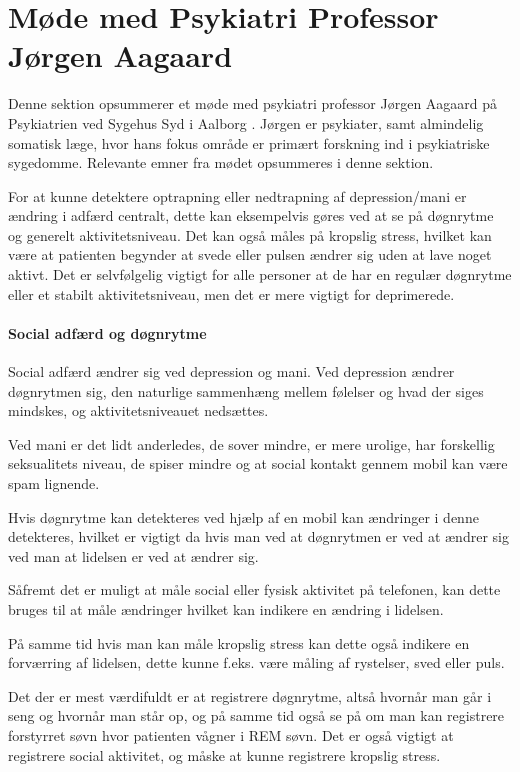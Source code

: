 \section{Møde med Psykiatri Professor Jørgen Aagaard}\label{sec:moede-med-joergen}
Denne sektion opsummerer et møde med psykiatri professor Jørgen Aagaard på Psykiatrien ved Sygehus Syd i Aalborg \citep{misc:jorgen-aagaard}. 
Jørgen er psykiater, samt almindelig somatisk læge, hvor hans fokus område er primært forskning ind i psykiatriske sygedomme.
Relevante emner fra mødet opsummeres i denne sektion.

For at kunne detektere optrapning eller nedtrapning af depression/mani er ændring i adfærd centralt, dette kan eksempelvis gøres ved at se på døgnrytme og generelt aktivitetsniveau. 
Det kan også måles på kropslig stress, hvilket kan være at patienten begynder at svede eller pulsen ændrer sig uden at lave noget aktivt. 
Det er selvfølgelig vigtigt for alle personer at de har en regulær døgnrytme eller et stabilt aktivitetsniveau, men det er mere vigtigt for deprimerede.

\paragraph{Social adfærd og døgnrytme}
Social adfærd ændrer sig ved depression og mani.
Ved depression ændrer døgnrytmen sig, den naturlige sammenhæng mellem følelser og hvad der siges mindskes, og aktivitetsniveauet nedsættes.

Ved mani er det lidt anderledes, de sover mindre, er mere urolige, har forskellig seksualitets niveau, de spiser mindre og at social kontakt gennem mobil kan være spam lignende. 

Hvis døgnrytme kan detekteres ved hjælp af en mobil kan ændringer i denne detekteres, hvilket er vigtigt da hvis man ved at døgnrytmen er ved at ændrer sig ved man at lidelsen er ved at ændrer sig.

Såfremt det er muligt at måle social eller fysisk aktivitet på telefonen, kan dette bruges til at måle ændringer hvilket kan indikere en ændring i lidelsen.

På samme tid hvis man kan måle kropslig stress kan dette også indikere en forværring af lidelsen, dette kunne f.eks. være måling af rystelser, sved eller puls. 

Det der er mest værdifuldt er at registrere døgnrytme, altså hvornår man går i seng og hvornår man står op, og på samme tid også se på om man kan registrere forstyrret søvn hvor patienten vågner i REM søvn. 
Det er også vigtigt at registrere social aktivitet, og måske at kunne registrere kropslig stress.

